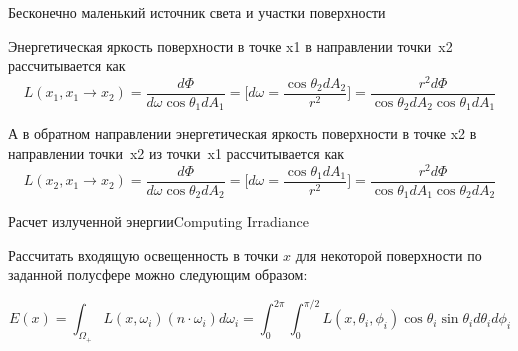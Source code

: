 \documentclass{beamer}
\begin{document}
	\begin{frame}{Бесконечно маленький источник света и участки поверхности}

		Энергетическая яркость поверхности в точке x1 в направлении точки~x2 рассчитывается как
		\[
			L(x_1,x_1 \to x_2) = 
			\frac{d \Phi}{d \omega \cos \theta_1 d A_1}
			=
			\biggl[ 
				d \omega = \frac{\cos \theta_2 d A_2 }{ r^2}
			\biggr]
			=
			\frac{r^2 d \Phi}{\cos \theta_2 d A_2   \cos \theta_1 d A_1}
		\]

		А в обратном направлении энергетическая яркость поверхности в точке x2 в направлении точки~x2 из точки~x1 рассчитывается как
		\[
			L(x_2,x_1 \to x_2) = 
			\frac{d \Phi}{d \omega \cos \theta_2 d A_2}
			=
			\biggl[ 
				d \omega = \frac{\cos \theta_1 d A_1 }{ r^2}
			\biggr]
			=
			\frac{r^2 d \Phi}{\cos \theta_1 d A_1 \cos \theta_2 d A_2}
		\]

	\end{frame}

	\begin{frame}{Расчет излученной энергии}{Computing Irradiance}

		Рассчитать входящую освещенность в точки $x$ для некоторой поверхности по заданной полусфере можно следующим образом:
		
		\[
			E(x) 
			= 
			\int_{\Omega_+} L(x, \omega_i) (n \cdot \omega_i) d \omega_i
			=
			\int_{0}^{2\pi}\int_{0}^{\pi / 2} 
			L(x, \theta_i, \phi_i) 
			\cos \theta_i 
			\sin \theta_i d \theta_i d \phi_i
		\]





	\end{frame}
\end{document}
